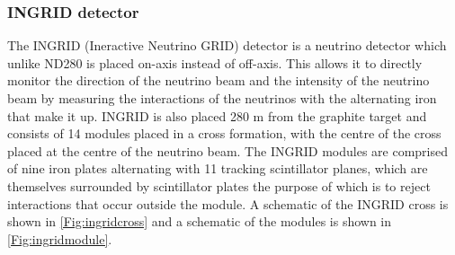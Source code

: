 \subsubsection{INGRID detector}

The INGRID (Ineractive Neutrino GRID) detector is a neutrino detector which unlike ND280 is placed on-axis instead of off-axis. This allows it to directly monitor the direction of the neutrino beam and the intensity of the neutrino beam by measuring the interactions of the neutrinos with the alternating iron that make it up. INGRID is also placed 280 m from the graphite target and consists of 14 modules placed in a cross formation, with the centre of the cross placed at the centre of the neutrino beam. The INGRID modules are comprised of nine iron plates alternating with 11 tracking scintillator planes, which are themselves surrounded by scintillator plates the purpose of which is to reject interactions that occur outside the module. A schematic of the INGRID cross is shown in \ref{Fig:ingridcross} and a schematic of the modules is shown in \ref{Fig:ingridmodule}. 

